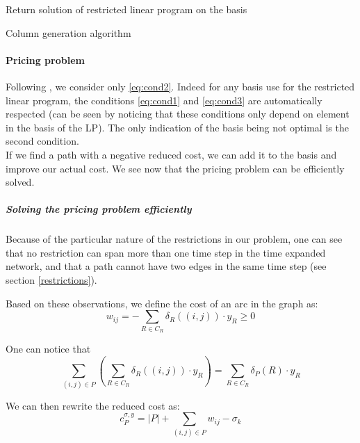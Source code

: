 \documentclass[14pt,a4paper]{article}
\theoremstyle{definition}
\numberwithin{equation}{subsection}
\begin{document}
\begin{algorithm}[H]
	\SetAlgoLined


	Return solution of restricted linear program on the basis\;
	
	
	\caption{Column generation algorithm}
\end{algorithm}






\paragraph{Pricing problem}
\label{pricing}

Following \cite[p.~669]{networkflows}, we consider only \eqref{eq:cond2}. Indeed for any basis use for the restricted linear program, the conditions \eqref{eq:cond1} and \eqref{eq:cond3} are automatically respected (can be seen by noticing that these conditions only depend on element in the basis of the LP). The only indication of the basis being not optimal is the second condition.
\\

If we find a path with a negative reduced cost, we can add it to the basis and improve our actual cost. We see now that the pricing problem can be efficiently solved.

\subparagraph{Solving the pricing problem efficiently}
Because of the particular nature of the restrictions in our problem, one can see that no restriction can span more than one time step in the time expanded network, and that a path cannot have two edges in the same time step (see section \ref*{restrictions}). 

Based on these observations, we define the cost of an arc in the graph as:
\begin{equation*}
w_{ij} = -\sum_{R \in C_R} \delta_R((i,j))\cdot y_R \geq 0
\end{equation*}

One can notice that 
$$ \sum_{(i,j)\in P}\left(\sum_{R \in C_R} \delta_R((i,j))\cdot y_R \right)=   \sum\limits_{R \in C_R}    \delta_P(R)\cdot y_R$$



We can then rewrite the reduced cost as: 
$$ c_P^{\sigma,y} = |P| + \sum\limits_{(i,j) \in P}  w_{ij} -\sigma_k $$
\end{document}
